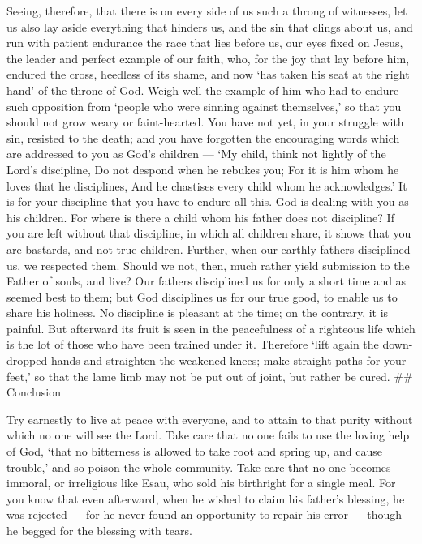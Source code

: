  Seeing, therefore, that there is on every side of us such a
throng of witnesses, let us also lay aside everything that hinders us,
and the sin that clings about us, and run with patient endurance the
race that lies before us,  our eyes fixed on Jesus, the
leader and perfect example of our faith, who, for the joy that lay
before him, endured the cross, heedless of its shame, and now `has taken
his seat at the right hand' of the throne of God.  Weigh
well the example of him who had to endure such opposition from `people
who were sinning against themselves,' so that you should not grow weary
or faint-hearted.  You have not yet, in your struggle with
sin, resisted to the death;  and you have forgotten the
encouraging words which are addressed to you as God's children --- `My
child, think not lightly of the Lord's discipline, Do not despond when
he rebukes you;  For it is him whom he loves that he
disciplines, And he chastises every child whom he acknowledges.'
 It is for your discipline that you have to endure all this.
God is dealing with you as his children. For where is there a child whom
his father does not discipline?  If you are left without
that discipline, in which all children share, it shows that you are
bastards, and not true children.  Further, when our earthly
fathers disciplined us, we respected them. Should we not, then, much
rather yield submission to the Father of souls, and live? 
Our fathers disciplined us for only a short time and as seemed best to
them; but God disciplines us for our true good, to enable us to share
his holiness.  No discipline is pleasant at the time; on
the contrary, it is painful. But afterward its fruit is seen in the
peacefulness of a righteous life which is the lot of those who have been
trained under it.  Therefore `lift again the down-dropped
hands and straighten the weakened knees;  make straight
paths for your feet,' so that the lame limb may not be put out of joint,
but rather be cured. \#\# Conclusion

 Try earnestly to live at peace with everyone, and to
attain to that purity without which no one will see the Lord.
 Take care that no one fails to use the loving help of God,
`that no bitterness is allowed to take root and spring up, and cause
trouble,' and so poison the whole community.  Take care
that no one becomes immoral, or irreligious like Esau, who sold his
birthright for a single meal.  For you know that even
afterward, when he wished to claim his father's blessing, he was
rejected --- for he never found an opportunity to repair his error ---
though he begged for the blessing with tears.

